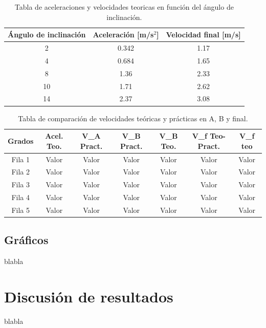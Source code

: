 \documentclass[twocolumn,12pt]{article}
\begin{document}
	\begin{table}[h!]
	\centering
	\begin{tabular}{|c|c|c|}
	\hline
	\textbf{Ángulo de inclinación} & \textbf{Aceleración [m/s\(^2\)]} & \textbf{Velocidad final [m/s]} \\ \hline
	2\textdegree & 0.342 & 1.17 \\ \hline
	4\textdegree & 0.684 & 1.65 \\ \hline
	8\textdegree & 1.36 & 2.33 \\ \hline
	10\textdegree & 1.71 & 2.62 \\ \hline
	14\textdegree & 2.37 & 3.08 \\ \hline
	\end{tabular}
	\caption{Tabla de aceleraciones y velocidades teoricas en función del ángulo de inclinación.}
	\label{tabla:caida_galileo}
	\end{table}

        \begin{table}[h!]
		\centering

		\begin{tabular}{|c|c|c|c|c|c|c|}
			\hline
			\rowcolor{white} %
			Grados & Acel. Teo. & V_{A} Pract.  & V_{B} Pract. & V_{B} Teo. & V_{f} Teo-Pract. & V_{f} teo \\ \hline
			Fila 1 & Valor & Valor & Valor & Valor & Valor & Valor \\ \hline
			Fila 2 & Valor & Valor & Valor & Valor & Valor & Valor \\ \hline
			Fila 3 & Valor & Valor & Valor & Valor & Valor & Valor \\ \hline
			Fila 4 & Valor & Valor & Valor & Valor & Valor & Valor \\ \hline
			Fila 5 & Valor & Valor & Valor & Valor & Valor & Valor \\ \hline
		\end{tabular}
		\caption{Tabla de comparación de velocidades teóricas y prácticas en A, B y final.}
		\label{tabla:caida_galileo}
	\end{table}

	\twocolumn

	\subsection{Gráficos}
	blabla
	
	\section{Discusión de resultados}
	blabla
	
\end{document}
